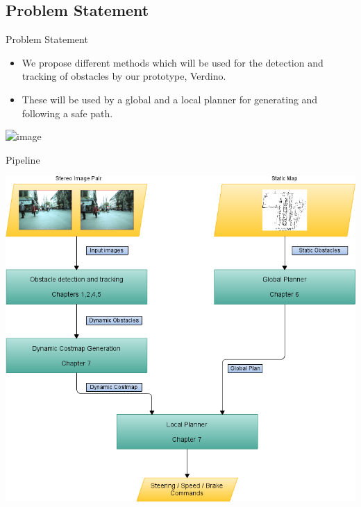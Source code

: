   \subsection{Problem Statement}
  \begin{frame}{Problem Statement}
    \begin{itemize}
     \item<1-> We propose different methods which will be used for the detection and tracking of obstacles by our prototype, Verdino.
     \item<2-> These will be used by a global and a local planner for generating and following a safe path.
    \end{itemize}
    \begin{center}
      \includegraphics<1->[height=.4\columnwidth]{verdino}
    \end{center}
  \end{frame}
  
  \begin{frame}{Pipeline}
    \begin{center}
      \includegraphics{pipeline_cp0}
    \end{center}
    
  \end{frame}

